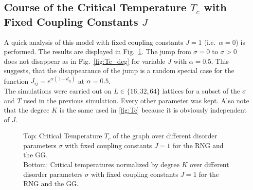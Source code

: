 \subsection{Course of the Critical Temperature $T_c$ with Fixed Coupling Constants $J$}
\label{appendix:fixedCoupling}
    A quick analysis of this model with fixed coupling constants \(J = 1\)
    (i.e.\ \(\alpha=0\)) is performed. The results are displayed in Fig.\ \ref{fig:Tc_deg_A0}.
    The jump from \(\sigma=0\) to \(\sigma>0\) does not disappear as in Fig.\ \ref{fig:Tc_deg}
    for variable \(J\) with \(\alpha=0.5\). This suggests, that the
    disappearance of the jump is a random special case for the function
    \(J_{ij}=e^{\alpha(1-d_{ij})}\) at \(\alpha=0.5\).\\
    The simulations were carried out on \(L \in \{16,32,64\}\) lattices
    for a subset of the \(\sigma\) and \(T\) used in the previous simulation.
    Every other parameter was kept. Also note that the degree \(K\) is
    the same used in \ref{fig:Tc}
    because it is obviously independent of \(J\).
    \begin{figure}[htbp]
        \centering


        \caption[Critical Temperature and Critical Temperature Normalized by Degree of the Graph for Fixed Coupling Constants $J=1$]
        {
            Top: Critical Temperature \(T_c\) of the graph over different
            disorder parameters \(\sigma\) with fixed coupling constants \(J=1\) for
             the RNG and
             the GG.\\
            Bottom: Critical temperatures normalized by degree \(K\) over
            different disorder parameters \(\sigma\) with fixed coupling constants \(J=1\) for
             the RNG and
             the GG.
        }
        \label{fig:Tc_deg_A0}
    \end{figure}\\
